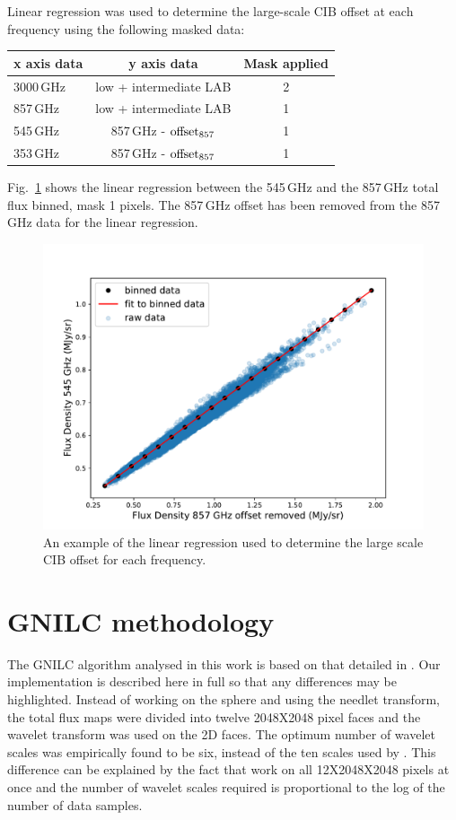 \documentclass[a4paper,fleqn,usenatbib]{mnras}
\begin{document}
{Linear regression was used to determine the large-scale CIB offset at each frequency using the following masked data: 

\begin{tabular}{ l | c | c  }
\hline
 x axis data & y axis data & Mask applied \\
  \hline
  3000\,GHz & low + intermediate LAB & 2 \\ 
  857\,GHz &  low + intermediate LAB & 1 \\
  545\,GHz & 857\,GHz - $\rm{offset}_{857}$ & 1 \\
  353\,GHz & 857\,GHz - $\rm{offset}_{857}$  & 1 \\
  \hline
\end{tabular}

Fig.~\ref{fig:ciboffsetLinear} shows the linear regression between the 545\,GHz and the 857\,GHz total flux binned, mask 1 pixels. The 857\,GHz offset has been removed from the 857\,GHz data for the linear regression. 

\begin{figure}
\centering
\includegraphics[width=0.95\linewidth]{ciboffsetEx}
\caption{An example of the linear regression used to determine the large scale CIB offset for each frequency.}
\label{fig:ciboffsetLinear}
\end{figure}

\section{GNILC methodology}\label{sec:apB}

The GNILC algorithm analysed in this work is based on that detailed in \citet{gnilc}. Our implementation is described here in full so that any differences may be highlighted. Instead of working on the sphere and using the needlet transform, the total flux maps were divided into twelve 2048X2048 pixel faces and the wavelet transform was used on the 2D faces. The optimum number of wavelet scales was empirically found to be six, instead of the ten scales used by \citet{gnilc}. This difference can be explained by the fact that \citet{gnilc} work on all 12X2048X2048 pixels at once and the number of wavelet scales required is proportional to the log of the number of data samples. 

}
\end{document}
